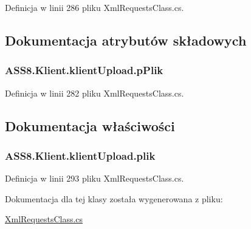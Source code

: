 Definicja w linii 286 pliku XmlRequestsClass.cs.

\subsection{Dokumentacja atrybutów składowych}
\hypertarget{a00011_b6779c02575a79c4964354a61dd9088f}{
\subsubsection[{pPlik}]{ {\bf ASS8.Klient.klientUpload.pPlik}}}
\label{da/d45/a00011_b6779c02575a79c4964354a61dd9088f}




Definicja w linii 282 pliku XmlRequestsClass.cs.

\subsection{Dokumentacja właściwości}
\hypertarget{a00011_768e461c6c80e2703893b7634d00146b}{
\subsubsection[{plik}]{ ASS8.Klient.klientUpload.plik}}
\label{da/d45/a00011_768e461c6c80e2703893b7634d00146b}




Definicja w linii 293 pliku XmlRequestsClass.cs.

Dokumentacja dla tej klasy została wygenerowana z pliku:\begin{CompactItemize}
\item 
\hyperlink{a00055}{XmlRequestsClass.cs}\end{CompactItemize}
